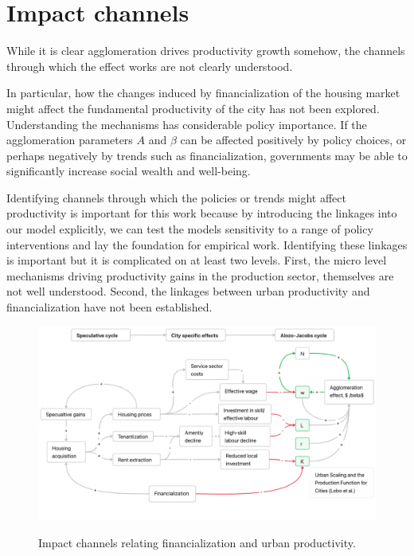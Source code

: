 \section{Impact channels}
While it is clear agglomeration drives productivity growth somehow,  the channels through which the effect works are not clearly understood. 

In particular, how the changes induced by financialization of the housing market might affect the fundamental productivity of the city has not been explored. Understanding the mechanisms has  considerable policy importance. If the agglomeration parameters $A$ and  $\beta$ can be affected positively by policy choices, or perhaps negatively by trends such as financialization,  governments may be able to significantly increase social wealth and well-being. 

Identifying channels through which the policies or trends might affect productivity  is important for this work because by introducing the linkages into our model explicitly, we can test the models sensitivity to a range of policy interventions and lay the foundation for empirical work. Identifying these linkages  is important but it is complicated on at least two levels. First, the micro level mechanisms driving productivity gains in the production sector, themselves are not well understood.  Second, the linkages between urban productivity and financialization have not been established.  




\begin{figure}[h!tb]
\begin{adjustwidth}{-0.24\textwidth}{-0.24\textwidth}
\centering
\includegraphics[scale=.3 ]{fig/impact-channels.png}%
\label{fig-impact-channels}
\end{adjustwidth}
\caption{Impact channels relating financialization and urban productivity.}
\end{figure}


